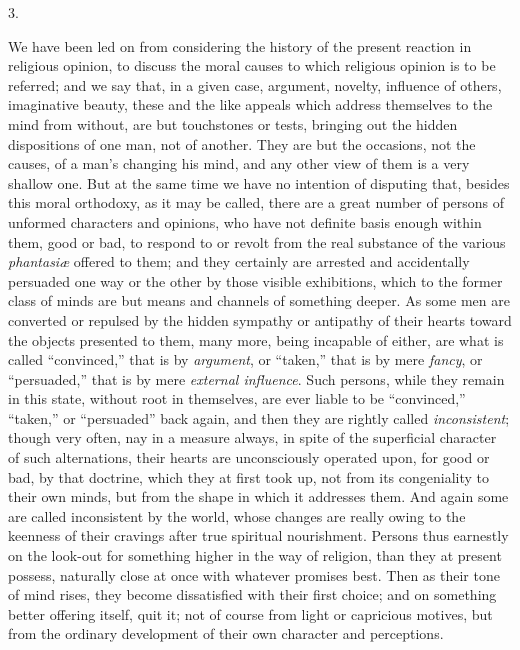 3.

We have been led on from considering the history
of the present reaction in religious opinion, to discuss the moral
causes to which religious opinion is to be referred; and we say that,
in a given case, argument, novelty, influence of others, imaginative
beauty, these and the like appeals which address themselves to
the mind from without, are but touchstones or tests, bringing out the
hidden dispositions of one man, not of another. They are but the
occasions, not the causes, of a man's changing his mind, and any other
view of them is a very shallow one. But at the same time we have no
intention of disputing that, besides this moral orthodoxy, as it may
be called, there are a great number of persons of unformed characters
and opinions, who have not definite basis enough within them, good or
bad, to respond to or revolt from the real substance of the various \emph{phantasiæ}
offered to them; and they certainly are arrested and accidentally
persuaded one way or the other by those visible exhibitions, which to
the former class of minds are but means and channels of something
deeper. As some men are converted or repulsed by the hidden sympathy
or antipathy of their hearts toward the objects presented to them,
many more, being incapable of either, are what is called ``convinced,''
that is by \emph{argument}, or ``taken,'' that is by mere \emph{fancy},
or ``persuaded,'' that is by mere \emph{external influence}. Such persons,
while they remain in this state, without root in themselves, are ever
liable to be ``convinced,'' ``taken,'' or ``persuaded'' back again, and then
they are rightly called \emph{inconsistent}; though very often, nay in
a measure always, in spite of the superficial character of such
alternations, their hearts are unconsciously operated upon, for good
or bad, by that doctrine, which they at first took up, not from its
congeniality to their own minds, but from the shape in which it
addresses them. And again some are called inconsistent by the world,
whose changes are really owing to the keenness of their cravings after
true spiritual nourishment. Persons thus earnestly on the look-out for
something higher in the way of religion, than they at present possess,
naturally close at once with whatever promises best. Then as
their tone of mind rises, they become dissatisfied with their first
choice; and on something better offering itself, quit it; not of
course from light or capricious motives, but from the ordinary
development of their own character and perceptions.

